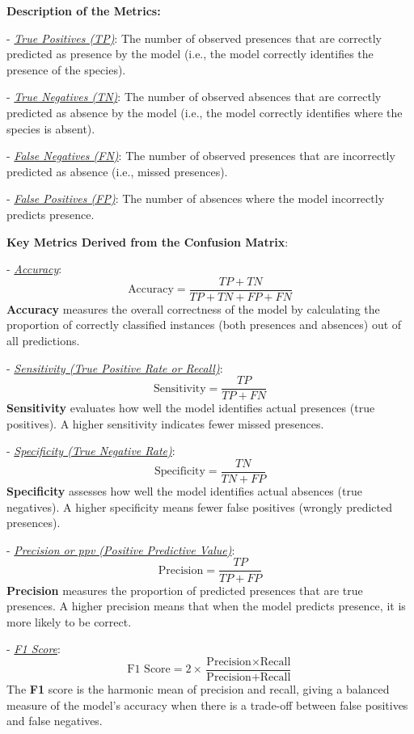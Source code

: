 \documentclass[
]{article}
\begin{document}
\begin{mdframed}[backgroundcolor=gray!10, linecolor=black!75, linewidth=2pt, roundcorner=5pt, shadow=true,frametitle={\textbf{BOX 2: \uline{Model evaluations for SDMs}}}]
\textbf{Description of the Metrics:}


- \uline{\textit{True Positives (TP)}}: The number of observed presences that are correctly predicted as presence by the model (i.e., the model correctly identifies the presence of the species).

- \uline{\textit{True Negatives (TN)}}: The number of observed absences that are correctly predicted as absence by the model (i.e., the model correctly identifies where the species is absent).
   
- \uline{\textit{False Negatives (FN)}}: The number of observed presences that are incorrectly predicted as absence (i.e., missed presences).

- \uline{\textit{False Positives (FP)}}: The number of absences where the model incorrectly predicts presence.


\textbf{Key Metrics Derived from the Confusion Matrix}:

- \uline{\textit{Accuracy}}: 
  \[
  \text{Accuracy} = \frac{TP + TN}{TP + TN + FP + FN}
  \]
\textbf{Accuracy} measures the overall correctness of the model by calculating the proportion of correctly classified instances (both presences and absences) out of all predictions.

- \uline{\textit{Sensitivity (True Positive Rate or Recall)}}:
  \[
  \text{Sensitivity} = \frac{TP}{TP + FN}
  \]
\textbf{Sensitivity} evaluates how well the model identifies actual presences (true positives). A higher sensitivity indicates fewer missed presences.

- \uline{\textit{Specificity (True Negative Rate)}}:
  \[
  \text{Specificity} = \frac{TN}{TN + FP}
  \]
\textbf{Specificity} assesses how well the model identifies actual absences (true negatives). A higher specificity means fewer false positives (wrongly predicted presences).

- \uline{\textit{Precision or ppv (Positive Predictive Value)}}:
  \[
  \text{Precision} = \frac{TP}{TP + FP}
  \]
\textbf{Precision} measures the proportion of predicted presences that are true presences. A higher precision means that when the model predicts presence, it is more likely to be correct.

- \uline{\textit{F1 Score}}:
  \[
  \text{F1 Score} = 2 \times \frac{\text{Precision} \times \text{Recall}}{\text{Precision} + \text{Recall}}
  \]
The \textbf{F1} score is the harmonic mean of precision and recall, giving a balanced measure of the model's accuracy when there is a trade-off between false positives and false negatives.



\end{mdframed}
\end{document}
